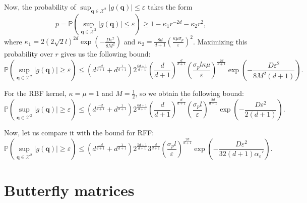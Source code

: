Now, the probability of $\sup_{\mathbf{q} \in \mathcal{X}^2}|g(\mathbf{q})| \leq \varepsilon$ takes the form
\[
p = \mathbb{P} \left ( \sup_{\mathbf{q} \in \mathcal{X}^2}|g(\mathbf{q})| \leq \varepsilon \right ) \geq
1 - \kappa_1 r^{-2d} - \kappa_2 r^2,
\]
where $\kappa_1 = 2 \left (2\sqrt{2}l \right)^{2d}\exp \left ( -\frac{D\varepsilon^2}{8M^2} \right )$
and
$\kappa_2 = \frac{8d}{d + 1}\left ( \frac{\kappa \mu \sigma_p}{\varepsilon} \right )^2$.
Maximizing this probability over $r$ gives us the following bound:
\[
\mathbb{P} \left ( \sup_{\mathbf{q} \in \mathcal{X}^2}|g(\mathbf{q})| \geq \varepsilon \right ) \leq
\left (d^{\frac{-d}{d + 1}} + d^{\frac{1}{d + 1}}\right ) 2^\frac{6d + 1}{d + 1}
\left ( \frac{d}{d + 1} \right)^{\frac{d}{d + 1}}
\left ( \frac{\sigma_p l \kappa \mu}{\varepsilon} \right )^{\frac{2d}{d + 1}}
\exp \left ( -\frac{D\varepsilon^2}{8M^2(d + 1)} \right ).
\]

For the RBF kernel, $\kappa = \mu = 1$ and $M = \frac12$, so we obtain the following bound:
\[
\mathbb{P} \left ( \sup_{\mathbf{q} \in \mathcal{X}^2}|g(\mathbf{q})| \geq \varepsilon \right ) \leq
\left (d^{\frac{-d}{d + 1}} + d^{\frac{1}{d + 1}}\right ) 2^\frac{6d + 1}{d + 1}
\left ( \frac{d}{d + 1} \right)^{\frac{d}{d + 1}}
\left ( \frac{\sigma_p l}{\varepsilon} \right )^{\frac{2d}{d + 1}}
\exp \left ( -\frac{D\varepsilon^2}{2(d + 1)} \right ).
\]

Now, let us compare it with the bound for RFF:
\[
\mathbb{P} \left ( \sup_{\mathbf{q} \in \mathcal{X}^2}|g(\mathbf{q})| \geq \varepsilon \right ) \leq
\left (d^{\frac{-d}{d + 1}} + d^{\frac{1}{d + 1}}\right )
2^\frac{5d + 1}{d + 1} 3^{\frac{d}{d + 1}}
\left ( \frac{\sigma_p l}{\varepsilon} \right )^{\frac{2d}{d + 1}}
\exp \left ( -\frac{D\varepsilon^2}{32(d + 1)\alpha_\varepsilon'} \right ).
\]



\section{Butterfly matrices}
\label{appendix:butterfly_details}


